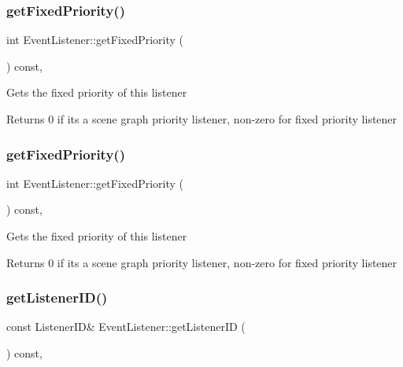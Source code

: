 \subsubsection{\texorpdfstring{get\+Fixed\+Priority()}{getFixedPriority()}\hspace{0.1cm}{\footnotesize\ttfamily [1/2]}}
{\footnotesize\ttfamily int Event\+Listener\+::get\+Fixed\+Priority (\begin{DoxyParamCaption}{ }\end{DoxyParamCaption}) const\hspace{0.3cm}{\ttfamily [inline]}, {\ttfamily [protected]}}

Gets the fixed priority of this listener \begin{DoxyReturn}{Returns}
0 if it\textquotesingle{}s a scene graph priority listener, non-\/zero for fixed priority listener 
\end{DoxyReturn}
\mbox{\label{classEventListener_ab19a7deec6bb7d936573ec33eff96891}} 
\subsubsection{\texorpdfstring{get\+Fixed\+Priority()}{getFixedPriority()}\hspace{0.1cm}{\footnotesize\ttfamily [2/2]}}
{\footnotesize\ttfamily int Event\+Listener\+::get\+Fixed\+Priority (\begin{DoxyParamCaption}{ }\end{DoxyParamCaption}) const\hspace{0.3cm}{\ttfamily [inline]}, {\ttfamily [protected]}}

Gets the fixed priority of this listener \begin{DoxyReturn}{Returns}
0 if it\textquotesingle{}s a scene graph priority listener, non-\/zero for fixed priority listener 
\end{DoxyReturn}
\mbox{\label{classEventListener_ad6a1e5ec2ed320b48801228317d56624}} 
\subsubsection{\texorpdfstring{get\+Listener\+I\+D()}{getListenerID()}\hspace{0.1cm}{\footnotesize\ttfamily [1/2]}}
{\footnotesize\ttfamily const Listener\+ID\& Event\+Listener\+::get\+Listener\+ID (\begin{DoxyParamCaption}{ }\end{DoxyParamCaption}) const\hspace{0.3cm}{\ttfamily [inline]}, {\ttfamily [protected]}}

